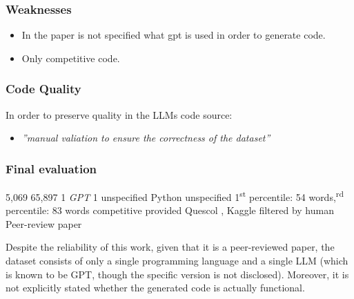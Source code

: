 \subsubsection*{Weaknesses}
\begin{itemize}
    \item In the paper is not specified what gpt is used in order to generate code.
    \item Only competitive code.
\end{itemize}


\subsubsection*{Code Quality}
In order to preserve quality in the LLMs code source:
\begin{itemize}
    \item \textit{”manual valiation to ensure the correctness of the dataset”}
\end{itemize}


\subsubsection*{Final evaluation}


\expandafter\def\csname Pan-et-alHumanCode\endcsname{5,069}
\expandafter\def\csname Pan-et-alLLMCode\endcsname{65,897}
\expandafter\def\csname Pan-et-alNumLLMs\endcsname{1 \textit{GPT}}
\expandafter\def\csname Pan-et-alLLMDiversity\endcsname{1}
\expandafter\def\csname Pan-et-alCurrentUse\endcsname{unspecified}
\expandafter\def\csname Pan-et-alLanguages\endcsname{Python}
\expandafter\def\csname Pan-et-alCodeTypes\endcsname{unspecified}
\expandafter\def\csname Pan-et-alCodeSize\endcsname{1\textsuperscript{st} percentile: 54 words,\textsuperscript{rd} percentile: 83 words}
\expandafter\def\csname Pan-et-alCodeContext\endcsname{competitive}
\expandafter\def\csname Pan-et-alPrompts\endcsname{provided}
\expandafter\def\csname Pan-et-alSources\endcsname{ Quescol \cite{quescol2023}, Kaggle \cite{wikipediaKaggle2023}}
\expandafter\def\csname Pan-et-alCodeQuality\endcsname{filtered by human}
\expandafter\def\csname Pan-et-alReliability\endcsname{Peer-review paper}


Despite the reliability of this work, given that it is a peer-reviewed paper, 
the dataset consists of only a single programming language and a single LLM 
(which is known to be GPT, though the specific version is not disclosed). 
Moreover, it is not explicitly stated whether the generated code is actually 
functional.


